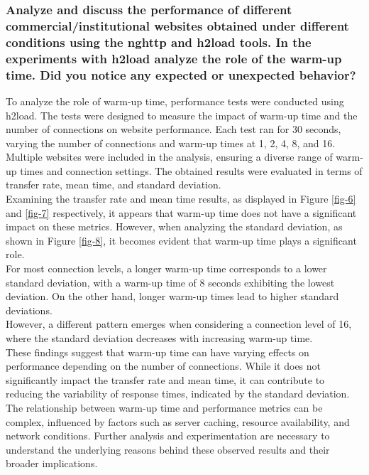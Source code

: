 \documentclass[eng]{class}
\begin{document}
\subsubsection*{Analyze and discuss the performance of different commercial/institutional websites obtained
	under different conditions using the nghttp and h2load tools. In the experiments with
	h2load analyze the role of the warm-up time. Did you notice any expected or unexpected
	behavior?}
To analyze the role of warm-up time, performance tests were conducted using h2load.
The tests were designed to measure the impact of warm-up time and the number of connections on website performance.
Each test ran for 30 seconds, varying the number of connections and warm-up times at 1, 2, 4, 8, and 16.\\
Multiple websites were included in the analysis, ensuring a diverse range of warm-up times and connection settings.
The obtained results were evaluated in terms of transfer rate, mean time, and standard deviation.\\
Examining the transfer rate and mean time results, as displayed in Figure \ref{fig-6} and \ref{fig-7} respectively,
it appears that warm-up time does not have a significant impact on these metrics.
However, when analyzing the standard deviation, as shown in Figure \ref{fig-8}, it becomes evident that warm-up time plays a significant role.\\
For most connection levels, a longer warm-up time corresponds to a lower standard deviation, with a warm-up time of 8 seconds exhibiting the lowest deviation.
On the other hand, longer warm-up times lead to higher standard deviations. \\
However, a different pattern emerges when considering a connection level of 16, where the standard deviation decreases with increasing warm-up time.\\
These findings suggest that warm-up time can have varying effects on performance depending on the number of connections.
While it does not significantly impact the transfer rate and mean time, it can contribute to reducing the variability of response times,
indicated by the standard deviation. The relationship between warm-up time and performance metrics can be complex,
influenced by factors such as server caching, resource availability, and network conditions.
Further analysis and experimentation are necessary to understand the underlying reasons behind these observed results and their broader implications.
\end{document}
